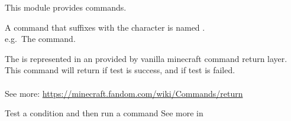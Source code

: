 This module provides  commands.

A command that suffixes with the character  is named .\\
e.g.\ The  command.

The  is represented in an  provided by vanilla minecraft command return layer.
This command will return  if test is success, and  if test is failed.\\\\
See more: \url{https://minecraft.fandom.com/wiki/Commands/return}

\begin{example}{Test a condition and then run a command}
    See more in~\\
\end{example}
